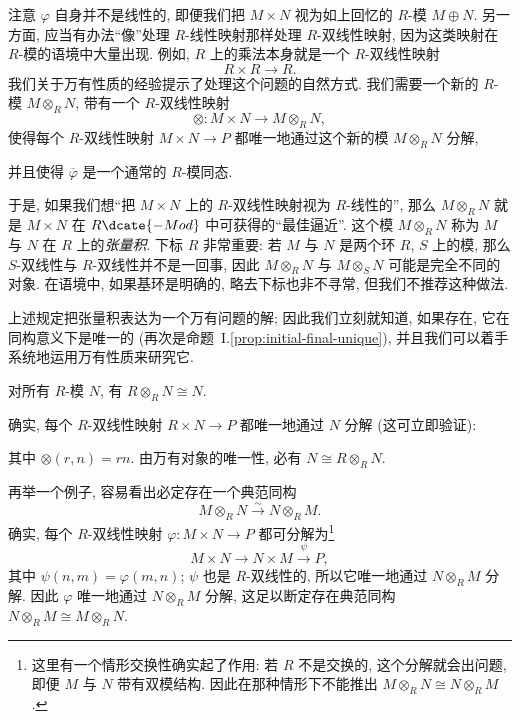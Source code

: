 注意 $\varphi$ 自身并不是线性的, 即便我们把 $M\times N$ 视为如上回忆的 $R$-模 $M\oplus N$. 另一方面, 应当有办法``像''处理 $R$-线性映射那样处理 $R$-双线性映射, 因为这类映射在 $R$-模的语境中大量出现. 例如, $R$ 上的乘法本身就是一个 $R$-双线性映射
\[
R\times R\to R.
\]
我们关于万有性质的经验提示了处理这个问题的自然方式. 我们需要一个新的 $R$-模 $M\otimes_R N$, 带有一个 $R$-双线性映射
\[
\otimes:M\times N\to M\otimes_R N,
\]
使得每个 $R$-双线性映射 $M\times N\to P$ 都唯一地通过这个新的模 $M\otimes_R N$ 分解,
\begin{center}
\end{center}
并且使得 $\overline{\varphi}$ 是一个通常的 $R$-模同态.

于是, 如果我们想``把 $M\times N$ 上的 $R$-双线性映射视为 $R$-线性的'', 那么 $M\otimes_R N$ 就是 $M\times N$ 在 $R\dcate{-Mod}$ 中可获得的``最佳逼近''. 这个模 $M\otimes_R N$ 称为 $M$ 与 $N$ 在 $R$ 上的\emph{张量积}. 下标 $R$ 非常重要: 若 $M$ 与 $N$ 是两个环 $R$, $S$ 上的模, 那么 $S$-双线性与 $R$-双线性并不是一回事, 因此 $M\otimes_R N$ 与 $M\otimes_S N$ 可能是完全不同的对象. 在语境中, 如果基环是明确的, 略去下标也非不寻常, 但我们不推荐这种做法.

上述规定把张量积表达为一个万有问题的解; 因此我们立刻就知道, 如果存在, 它在同构意义下是唯一的 (再次是命题~I.\ref{prop:initial-final-unique}), 并且我们可以着手系统地运用万有性质来研究它.

\begin{example}\label{ex:tensor-r-n}
对所有 $R$-模 $N$, 有 $R\otimes_R N\cong N$.

确实, 每个 $R$-双线性映射 $R\times N\to P$ 都唯一地通过 $N$ 分解 (这可立即验证):
\begin{center}
\end{center}
其中 $\otimes(r,n)=rn$. 由万有对象的唯一性, 必有 $N\cong R\otimes_R N$.
\end{example}

再举一个例子, 容易看出必定存在一个典范同构
\[
M\otimes_R N\xrightarrow{\sim} N\otimes_R M.
\]
确实, 每个 $R$-双线性映射 $\varphi:M\times N\to P$ 都可分解为\footnote{这里有一个情形交换性确实起了作用: 若 $R$ 不是交换的, 这个分解就会出问题, 即便 $M$ 与 $N$ 带有双模结构. 因此在那种情形下不能推出 $M\otimes_R N\cong N\otimes_R M$.}
\[
M\times N\xrightarrow{\quad} N\times M\xrightarrow{\psi} P,
\]
其中 $\psi(n,m)=\varphi(m,n)$; $\psi$ 也是 $R$-双线性的, 所以它唯一地通过 $N\otimes_R M$ 分解. 因此 $\varphi$ 唯一地通过 $N\otimes_R M$ 分解, 这足以断定存在典范同构 $N\otimes_R M\cong M\otimes_R N$.

